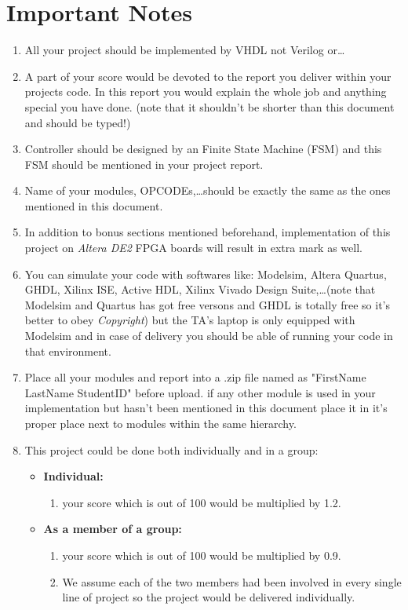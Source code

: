 \documentclass{report}
\begin{document}
\section{Important Notes}

\begin{enumerate}
	\item
		All your project should be implemented by VHDL not Verilog or\ldots
	\item
		A part of your score would be devoted to the report you deliver within your projects code. In this report you would explain the whole job and anything special you have done. (note that it shouldn't be shorter than this document and should be typed!)
	\item
		Controller should be designed by an Finite State Machine (FSM) and this FSM should be mentioned in your project report.
	\item
		Name of your modules, OPCODEs,\ldots should be exactly the same as the ones mentioned in this document.
	\item
		In addition to bonus sections mentioned beforehand, implementation of this project on \textit{Altera DE2} FPGA boards will result in extra mark as well.
	\item
		You can simulate your code with softwares like: Modelsim, Altera Quartus, GHDL, Xilinx ISE, Active HDL, Xilinx Vivado Design Suite,\ldots (note that Modelsim and Quartus has got free versons and GHDL is totally free so it's better to obey \textit{Copyright}) but the TA's laptop is only equipped with Modelsim and in case of delivery you should be able of running your code in that environment.
	\item
		Place all your modules and report into a .zip file named as "FirstName LastName StudentID" before upload. if any other module is used in your implementation but hasn't been mentioned in this document place it in it's proper place next to modules within the same hierarchy.
	\item
		This project could be done both individually and in a group:
		\begin{itemize}
			\item \textbf{Individual:}
				\begin{enumerate}
					\item
						your score which is out of 100 would be multiplied by 1.2.

				\end{enumerate}
			\item \textbf{As a member of a group:}
				\begin{enumerate}
					\item
						your score which is out of 100 would be multiplied by 0.9.
					\item
						We assume each of the two members had been involved in every single line of project so the project would be delivered individually.
				\end{enumerate}
		\end{itemize}


\end{enumerate}
\end{document}
